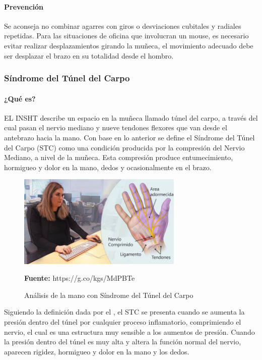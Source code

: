 \paragraph{Prevención}
Se aconseja no combinar agarres con giros o desviaciones cubitales y radiales repetidas. Para las situaciones de oficina que involucran un mouse, es necesario evitar realizar desplazamientos girando la muñeca, el movimiento adecuado debe ser desplazar el brazo en su totalidad desde el hombro. \parencite[5]{INSHT2017TendinitisPulgar}
\subsubsection{Síndrome del Túnel del Carpo}
\paragraph{¿Qué es?}
EL INSHT describe un espacio en la muñeca llamado túnel del carpo, a través del cual pasan el nervio mediano y nueve tendones flexores que van desde el antebrazo hacia la mano\parencite[1]{INSHT2017SindromeCarpiano}. Con base en lo anterior se define el Síndrome del Túnel del Carpo (STC) como una condición producida por la compresión del Nervio Mediano, a nivel de la muñeca. Esta compresión produce entumecimiento, hormigueo y dolor en la mano, dedos y ocasionalmente en el brazo. \parencite[1]{INSHT2017SindromeCarpiano}

\begin{figure}[H]
    \centering
    \includegraphics[width=0.7\textwidth]{Anexos/LATEX/chapters/images/STC.jpg}
    \caption{Análisis de la mano con Síndrome del Túnel del Carpo}
    \small{\textbf{Fuente:} https://g.co/kgs/MdPBTe}
    \label{STC}
\end{figure}

Siguiendo la definición dada por el \parencite{INSHT2017SindromeCarpiano}, el STC se presenta cuando se aumenta la presión dentro del túnel por cualquier proceso inflamatorio, comprimiendo el nervio, el cual es una estructura muy sensible a los aumentos de presión. Cuando la presión dentro del túnel es muy alta y altera la función normal del nervio, aparecen rigidez, hormigueo y dolor en la mano y los dedos.
